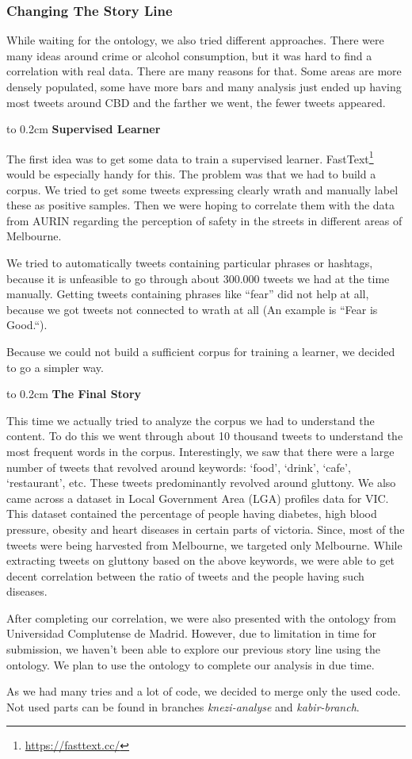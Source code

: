 \subsubsection{Changing The Story Line}

While waiting for the ontology, we also tried different approaches.
There were many ideas around crime or alcohol consumption, but it was hard to find a correlation with real data. There are many reasons for that. Some areas are more densely populated, some have more bars and many analysis just ended up having most tweets around CBD and the farther we went, the fewer tweets appeared.

\vbox to 0.2cm{}
{\bf Supervised Learner}

The first idea was to get some data to train a supervised learner. FastText\footnote{\url{https://fasttext.cc/}} would be especially handy for this. The problem was that we had to build a corpus. We tried to get some tweets expressing clearly wrath and manually label these as positive samples. Then we were hoping to correlate them with the data from AURIN regarding the perception of safety in the streets in different areas of Melbourne.

We tried to automatically tweets containing particular phrases or hashtags, because it is unfeasible to go through about 300.000 tweets we had at the time manually. Getting tweets containing phrases like ``fear'' did not help at all, because we got tweets not connected to wrath at all (An example is ``Fear is Good.``).

Because we could not build a sufficient corpus for training a learner, we decided to go a simpler way.

\vbox to 0.2cm{}
{\bf The Final Story}


This time we actually tried to analyze the corpus we had to understand the content. To do this we went through about 10 thousand tweets to understand the most frequent words in the corpus. Interestingly, we saw that there were a large number of tweets that revolved around keywords: ‘food’, ‘drink’, ‘cafe’, ‘restaurant’, etc. These tweets predominantly revolved around gluttony. We also came across a dataset in Local Government Area (LGA) profiles data for VIC. This dataset contained the percentage of people having diabetes, high blood pressure, obesity and heart diseases in certain parts of victoria. Since, most of the tweets were being harvested from Melbourne, we targeted only Melbourne. While extracting tweets on gluttony based on the above keywords, we were able to get decent correlation between the ratio of tweets and the people having such diseases. 

After completing our correlation, we were also presented with the ontology from Universidad Complutense de Madrid. However, due to limitation in time for submission, we haven’t been able to explore our previous story line using the ontology. We plan to use the ontology to complete our analysis in due time.

As we had many tries and a lot of code, we decided to merge only the used code. Not used parts can be found in branches {\it knezi-analyse} and {\it kabir-branch}.